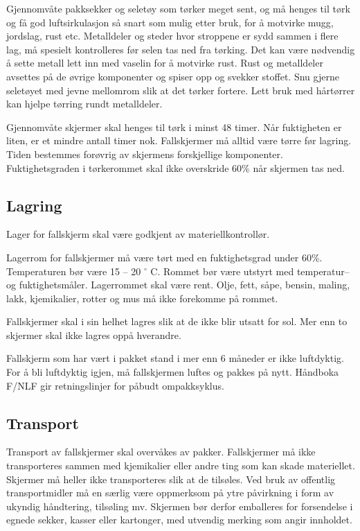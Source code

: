 Gjennomvåte pakksekker og seletøy som tørker meget sent, og må henges til tørk og få god luftsirkulasjon så snart som mulig etter bruk, for å motvirke mugg, jordslag, rust etc. Metalldeler og steder hvor stroppene er sydd sammen i flere lag, må spesielt kontrolleres før selen tas ned fra tørking. Det kan være nødvendig å sette metall lett inn med vaselin for å motvirke rust. Rust og metalldeler avsettes på de øvrige komponenter og spiser opp og svekker stoffet. Snu gjerne seletøyet med jevne mellomrom slik at det tørker fortere. Lett bruk med hårtørrer kan hjelpe tørring rundt metalldeler.

Gjennomvåte skjermer skal henges til tørk i minst 48 timer. Når fuktigheten er liten, er et mindre antall timer nok. Fallskjermer må alltid være tørre før lagring. Tiden bestemmes forøvrig av skjermens forskjellige komponenter. Fuktighetsgraden i tørkerommet skal ikke overskride 60\% når skjermen tas ned.

\subsection{Lagring}
Lager for fallskjerm skal være godkjent av materiellkontrollør.

Lagerrom for fallskjermer må være tørt med en fuktighetsgrad under 60\%. Temperaturen bør være 15 – 20 \ensuremath{^\circ} C. Rommet bør være utstyrt med temperatur– og fuktighetsmåler. Lagerrommet skal være rent. Olje, fett, såpe, bensin, maling, lakk, kjemikalier, rotter og mus må ikke forekomme på rommet.

Fallskjermer skal i sin helhet lagres slik at de ikke blir utsatt for sol. Mer enn to skjermer skal ikke lagres oppå hverandre.

Fallskjerm som har vært i pakket stand i mer enn 6 måneder er ikke luftdyktig. For å bli luftdyktig igjen, må fallskjermen luftes og pakkes på nytt. Håndboka F/NLF gir retningslinjer for påbudt ompakksyklus.

\subsection{Transport}
Transport av fallskjermer skal overvåkes av pakker. Fallskjermer må ikke transporteres sammen med kjemikalier eller andre ting som kan skade materiellet. Skjermer må heller ikke transporteres slik at de tilsøles. Ved bruk av offentlig transportmidler må en særlig være oppmerksom på ytre påvirkning i form av ukyndig håndtering, tilsøling mv. Skjermen bør derfor emballeres for forsendelse i egnede sekker, kasser eller kartonger, med utvendig merking som angir innholdet.


